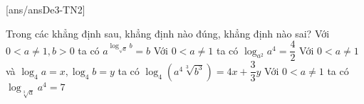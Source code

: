 \TNTF
{}[ans/ansDe3-TN2]
\begin{ex} 	%
Trong các khẳng định sau, khẳng định nào đúng, khẳng định nào sai?
\choiceTF
{ Với $0< a \ne 1, b> 0 $ ta có $a^{\log_{\sqrt{a}}b} = b$}
{\True  Với $0< a \ne 1$ ta có $\log_{a^2}{a^4} = \dfrac{4}{2}$}
{\True Với $0< a \ne 1$ và $\log_4{a} = x, \log_4{b} = y$ ta có $\log_4(a^{4}\sqrt[3]{b^{3}}) = 4x + \dfrac{3}{3}y$}
{Với $0< a \ne 1$ ta có $\log_{\sqrt[3]{a}}{{a}^4} = 7$}

\end{ex}

